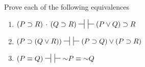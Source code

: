 {\begin{enumerate}[label=(\arabic*)]
%
%
%




\end{enumerate}

\noindent\problempart
Prove each of the following equivalences
\begin{enumerate}[label=(\arabic*)]

\item $(P \eif R) \eand (Q \eif R) \nsststile{}{} \hspace{.5em} \sststile{}{}(P \eor Q) \eif R $ %
\item $(P \eif (Q \eor R)) \nsststile{}{} \hspace{.5em} \sststile{}{} (P \eif Q) \eor (P \eif R)$ %
\item $(P \eiff Q)  \nsststile{}{} \hspace{.5em} \sststile{}{} \enot P \eiff \enot Q		$ %
\end{enumerate}

}
